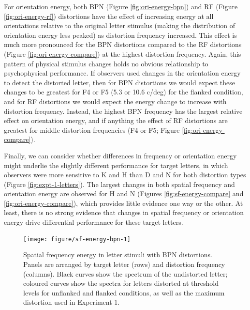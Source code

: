 \documentclass[doc, 11pt,a4paper,natbib]{apa6}\usepackage[]{graphicx}\usepackage[]{color}
\newenvironment{knitrout}{}{} %
\begin{document}
For orientation energy, both BPN (Figure \ref{fig:ori-energy-bpn}) and RF (Figure \ref{fig:ori-energy-rf}) distortions have the effect of increasing energy at all orientations relative to the original letter stimulus (making the distribution of orientation energy less peaked) as distortion frequency increased.
This effect is much more pronounced for the BPN distortions compared to the RF distortions (Figure \ref{fig:ori-energy-compare}) at the highest distortion frequency.
Again, this pattern of physical stimulus changes holds no obvious relationship to psychophysical performance.
If observers used changes in the orientation energy to detect the distorted letter, then for BPN distortions we would expect these changes to be greatest for F4 or F5 (5.3 or 10.6 c/deg) for the flanked condition, and for RF distortions we would expect the energy change to increase with distortion frequency.
Instead, the highest BPN frequency has the largest relative effect on orientation energy, and if anything the effect of RF distortions are greatest for middle distortion frequencies (F4 or F5; Figure \ref{fig:ori-energy-compare}).

Finally, we can consider whether differences in frequency or orientation energy might underlie the slightly different performance for target letters, in which observers were more sensitive to K and H than D and N for both distortion types (Figure \ref{fig:expt-1-letters}).
The largest changes in both spatial frequency and orientation energy are observed for H and N (Figures \ref{fig:sf-energy-compare} and \ref{fig:ori-energy-compare}), which provides little evidence one way or the other.
At least, there is no strong evidence that changes in spatial frequency or orientation energy drive differential performance for these target letters.






\begin{knitrout}
\color{fgcolor}\begin{figure}
\texttt{[image: figure/sf-energy-bpn-1]} \caption[Spatial frequency energy in letter stimuli with BPN distortions]{Spatial frequency energy in letter stimuli with BPN distortions.
              Panels are arranged by target letter (rows) and distortion frequency (columns).
              Black curves show the spectrum of the undistorted letter; coloured curves show the
              spectra for letters distorted at threshold levels for unflanked and flanked conditions, as
              well as the maximum distortion used in Experiment 1.}\label{fig:sf-energy-bpn}
\end{figure}


\end{knitrout}
\end{document}
